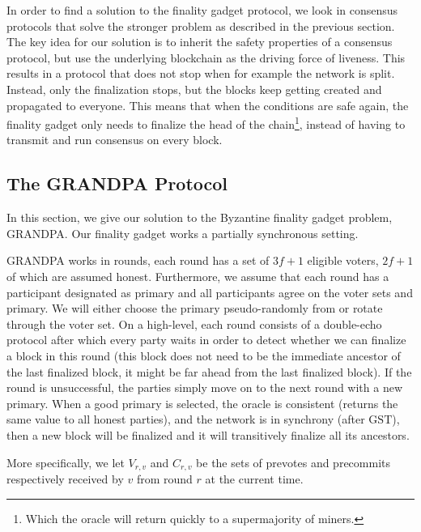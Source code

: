 \documentclass[a4paper,UKenglish,cleveref, autoref, thm-restate, anonymous]{lipics-v2019}
\def\GST{\mathrm{GST}}
\begin{document}
In order to find a solution to the finality gadget protocol, we look in
consensus protocols that solve the stronger problem as described in the previous section. The key idea for our solution is to inherit the safety properties of a consensus protocol, but use the underlying blockchain as the driving force of liveness. This results in a protocol that does not stop when for example the network is split. 
Instead, only the finalization stops, but the blocks keep getting created and propagated to everyone.
This means that when the conditions are safe again, the finality gadget only needs to finalize the head of the chain\footnote{Which the oracle will return quickly to a supermajority of miners.},
instead of having to transmit and run consensus on every block. 





\subsection{The GRANDPA Protocol}\label{sec:grandpa}
In this section, we give our solution to the Byzantine finality gadget problem, GRANDPA.  Our finality gadget works a partially synchronous setting.

GRANDPA works in rounds, each round has a set of $3f+1$ eligible voters, $2f+1$ of which are assumed honest. Furthermore, we assume that each round has a participant designated as primary and all participants agree on the voter sets and primary. We will either choose the primary pseudo-randomly from or rotate through the voter set.
On a high-level, each round consists of a double-echo protocol after which every party waits in order to detect whether we can finalize a block in this round (this block does not need to be the immediate ancestor of the last finalized block, it might be far ahead from the last finalized block). If the round is unsuccessful, the parties simply move on to the next round with a new primary. When a good primary is selected, the oracle is consistent (returns the same value to all honest parties),
and the network is in synchrony (after $\GST$), then a new block will be finalized and it will transitively finalize all its ancestors.

More specifically, we let $V_{r,v}$ and $C_{r,v}$ be the sets of prevotes and precommits respectively received by $v$ from round $r$ at the current time.
\end{document}
